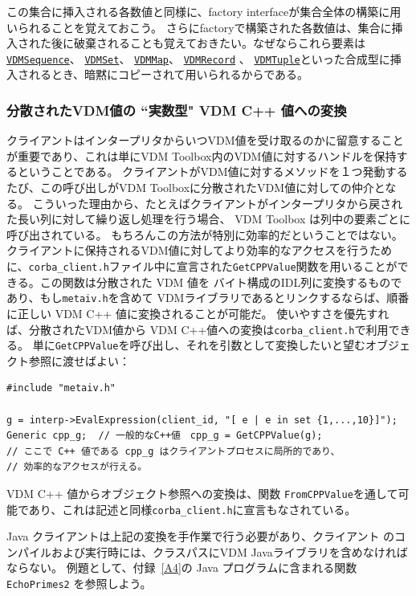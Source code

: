 \documentclass[\pformat,12pt]{jarticle}
\newcommand{\VDMMap}{\hyperlink{interface.VDMMap}{VDMMap}}
\newcommand{\VDMRecord}{\hyperlink{interface.VDMRecord}{VDMRecord}}
\newcommand{\VDMSequence}{\hyperlink{interface.VDMSequence}{VDMSequence}}
\newcommand{\VDMSet}{\hyperlink{interface.VDMSet}{VDMSet}}
\newcommand{\VDMTuple}{\hyperlink{interface.VDMTuple}{VDMTuple}}
\begin{document}
この集合に挿入される各数値と同様に、factory interfaceが集合全体の構築に用いられることを覚えておこう。
さらにfactoryで構築された各数値は、集合に挿入された後に破棄されることも覚えておきたい。なぜならこれら要素は{\tt \VDMSequence}、 {\tt  \VDMSet}、 {\tt \VDMMap}、 {\tt \VDMRecord} 、 {\tt \VDMTuple}といった合成型に挿入されるとき、暗黙にコピーされて用いられるからである。

\subsubsection{分散されたVDM値の ``実数型" VDM C++ 値への変換　}

クライアントはインタープリタからいつVDM値を受け取るのかに留意することが重要であり、これは単にVDM Toolbox内のVDM値に対するハンドルを保持するということである。
クライアントがVDM値に対するメソッドを１つ発動するたび、この呼び出しがVDM Toolboxに分散されたVDM値に対しての仲介となる。
こういった理由から、たとえばクライアントがインタープリタから戻された長い列に対して繰り返し処理を行う場合、 VDM Toolbox は列中の要素ごとに呼び出されている。
もちろんこの方法が特別に効率的だということではない。
クライアントに保持されるVDM値に対してより効率的なアクセスを行うために、\texttt{corba\_client.h}ファイル中に宣言された{\tt GetCPPValue}関数を用いることができる。この関数は分散された VDM 値を バイト構成のIDL列に変換するものであり、もし{\tt metaiv.h}を含めて VDMライブラリである\cite{LibMan-SCSK}とリンクするならば、順番に正しい VDM C++ 値に変換されることが可能だ。
使いやすさを優先すれば、分散されたVDM値から VDM C++値への変換は{\tt corba\_client.h}で利用できる。
単に{\tt GetCPPValue}を呼び出し、それを引数として変換したいと望むオブジェクト参照に渡せばよい：

\begin{verbatim}
#include "metaiv.h"

g = interp->EvalExpression(client_id, "[ e | e in set {1,...,10}]");
Generic cpp_g;  // 一般的なC++値　cpp_g = GetCPPValue(g);
// ここで C++ 値である cpp_g はクライアントプロセスに局所的であり、
// 効率的なアクセスが行える。
\end{verbatim}

 VDM C++ 値からオブジェクト参照への変換は、関数 {\tt FromCPPValue}を通して可能であり、これは記述と同様{\tt corba\_client.h}に宣言もなされている。

Java クライアントは上記の変換を手作業で行う必要があり、クライアント \cite{CGJavaManPP-SCSK}のコンパイルおよび実行時には、クラスパスにVDM Javaライブラリを含めなければならない。
例題として、付録~\ref{A4}の Java プログラムに含まれる関数 \texttt{EchoPrimes2} を参照しよう。
\end{document}
